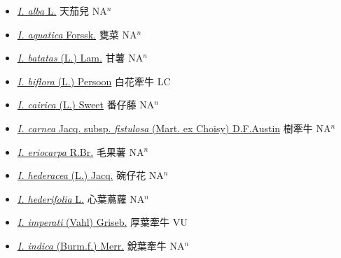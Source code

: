 \begin{itemize}
  \begin{itemize}
        \item[] \href{http://www.theplantlist.org/tpl1.1/search?q=Ipomoea+alba}{\textit{I. alba} L.}   天茄兒 NA$^n$
        \item[] \href{http://www.theplantlist.org/tpl1.1/search?q=Ipomoea+aquatica}{\textit{I. aquatica} Forssk.}   甕菜 NA$^n$
        \item[] \href{http://www.theplantlist.org/tpl1.1/search?q=Ipomoea+batatas}{\textit{I. batatas} (L.) Lam.}   甘薯 NA$^n$
        \item[] \href{http://www.theplantlist.org/tpl1.1/search?q=Ipomoea+biflora}{\textit{I. biflora} (L.) Persoon}   白花牽牛 LC
        \item[] \href{http://www.theplantlist.org/tpl1.1/search?q=Ipomoea+cairica}{\textit{I. cairica} (L.) Sweet}   番仔藤 NA$^n$
        \item[] \href{http://www.theplantlist.org/tpl1.1/search?q=Ipomoea+carnea+subsp.+fistulosa}{\textit{I. carnea} Jacq. subsp. \textit{fistulosa} (Mart. ex Choisy) D.F.Austin}   樹牽牛 NA$^n$
        \item[] \href{http://www.theplantlist.org/tpl1.1/search?q=Ipomoea+eriocarpa}{\textit{I. eriocarpa} R.Br.}   毛果薯 NA$^n$
        \item[] \href{http://www.theplantlist.org/tpl1.1/search?q=Ipomoea+hederacea}{\textit{I. hederacea} (L.) Jacq.}   碗仔花 NA$^n$
        \item[] \href{http://www.theplantlist.org/tpl1.1/search?q=Ipomoea+hederifolia}{\textit{I. hederifolia} L.}   心葉蔦蘿 NA$^n$
        \item[] \href{http://www.theplantlist.org/tpl1.1/search?q=Ipomoea+imperati}{\textit{I. imperati} (Vahl) Griseb.}   厚葉牽牛 VU
        \item[] \href{http://www.theplantlist.org/tpl1.1/search?q=Ipomoea+indica}{\textit{I. indica} (Burm.f.) Merr.}   銳葉牽牛 NA$^n$

\end{itemize}
\end{itemize}
